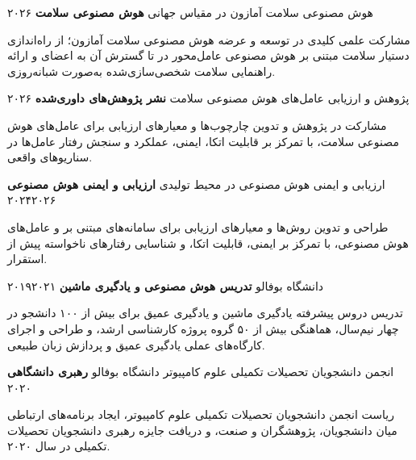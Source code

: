 
\begin{cventries}

  \cventry
    {هوش مصنوعی سلامت آمازون در مقیاس جهانی}
    {\textbf{هوش مصنوعی سلامت}}
    {۲۰۲۶}
    {}
    {\begin{cvitems}\item {مشارکت علمی کلیدی در توسعه و عرضه هوش مصنوعی سلامت آمازون؛ از راه‌اندازی دستیار سلامت مبتنی بر هوش مصنوعی عامل‌محور در  تا گسترش آن به اعضای  و ارائه راهنمایی سلامت شخصی‌سازی‌شده به‌صورت شبانه‌روزی.}\end{cvitems}}

  \cventry
    {پژوهش و ارزیابی عامل‌های هوش مصنوعی سلامت}
    {\textbf{نشر پژوهش‌های داوری‌شده}}
    {۲۰۲۶}
    {}
    {\begin{cvitems}\item {مشارکت در پژوهش و تدوین چارچوب‌ها و معیارهای ارزیابی برای عامل‌های هوش مصنوعی سلامت، با تمرکز بر قابلیت اتکا، ایمنی، عملکرد و سنجش رفتار عامل‌ها در سناریوهای واقعی.}\end{cvitems}}

  \cventry
    {ارزیابی و ایمنی هوش مصنوعی در محیط تولیدی}
    {\textbf{ارزیابی و ایمنی هوش مصنوعی}}
    {۲۰۲۴۲۰۲۶}
    {}
    {\begin{cvitems}\item {طراحی و تدوین روش‌ها و معیارهای ارزیابی برای سامانه‌های مبتنی بر  و عامل‌های هوش مصنوعی، با تمرکز بر ایمنی، قابلیت اتکا،  و شناسایی رفتارهای ناخواسته پیش از استقرار.}\end{cvitems}}

  \cventry
    {دانشگاه بوفالو}
    {\textbf{تدریس هوش مصنوعی و یادگیری ماشین}}
    {۲۰۱۹۲۰۲۱}
    {}
    {\begin{cvitems}\item {تدریس دروس پیشرفته یادگیری ماشین و یادگیری عمیق برای بیش از ۱۰۰ دانشجو در چهار نیم‌سال، هماهنگی بیش از ۵۰ گروه پروژه کارشناسی ارشد، و طراحی و اجرای کارگاه‌های عملی یادگیری عمیق و پردازش زبان طبیعی.}\end{cvitems}}

  \cventry
    {انجمن دانشجویان تحصیلات تکمیلی علوم کامپیوتر دانشگاه بوفالو}
    {\textbf{رهبری دانشگاهی}}
    {۲۰۲۰}
    {}
    {\begin{cvitems}\item {ریاست انجمن دانشجویان تحصیلات تکمیلی علوم کامپیوتر، ایجاد برنامه‌های ارتباطی میان دانشجویان، پژوهشگران و صنعت، و دریافت جایزه رهبری دانشجویان تحصیلات تکمیلی در سال ۲۰۲۰.}\end{cvitems}}

\end{cventries}

